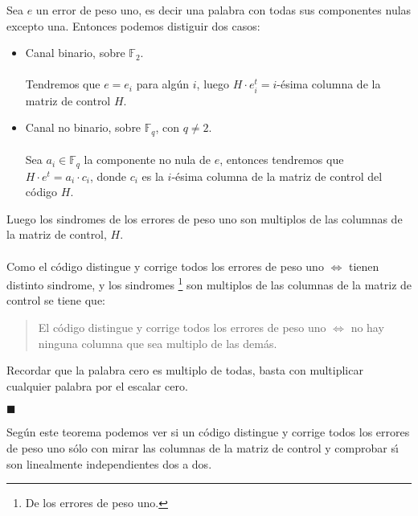 %
\newpage
%
Sea $e$ un error de peso uno, es decir una palabra con todas sus componentes
nulas excepto una. Entonces podemos distiguir dos casos:
\begin{itemize}
\item Canal binario, sobre $\mathbb{F}_2$.\\ \\
%
Tendremos que $e=e_i$ para alg\'un $i$, luego $H\cdot e_i^t=i$-\'esima columna
de la matriz de control $H$.
\item Canal no binario, sobre $\mathbb{F}_q$, con $q\neq 2$.\\ \\
%
Sea $a_i\in \mathbb{F}_q$ la componente no nula de $e$, entonces tendremos que
$H\cdot e^t=a_i\cdot c_i$, donde $c_i$ es la $i$-\'esima columna de la matriz
de control del c\'odigo $H$.
\end{itemize}
Luego los sindromes de los errores de peso uno son multiplos de las columnas
de la matriz de control, $H$.\\ \\
%
Como el c\'odigo distingue y corrige todos los errores de peso uno
$\Longleftrightarrow$ tienen distinto sindrome, y los sindromes%
\footnote{De los errores de peso uno.} son multiplos de las columnas de la
matriz de control se tiene que:
\begin{quote}
El c\'odigo distingue y corrige todos los errores de peso uno
$\Longleftrightarrow$ no hay ninguna columna que sea multiplo de las
dem\'as.
\end{quote}
Recordar que la palabra cero es multiplo de todas, basta con multiplicar
cualquier palabra por el escalar cero.
\begin{flushright}
$\blacksquare$
\end{flushright}
Seg\'un este teorema podemos ver si un c\'odigo distingue y corrige todos
los errores de peso uno s\'olo con mirar las columnas de la matriz de control
y comprobar s\'{\i} son linealmente independientes dos a dos.
